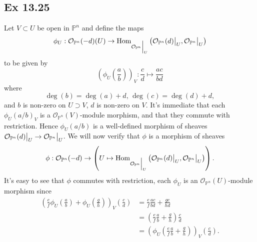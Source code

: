 \documentclass{article}
\newcommand\restr[2]{{%
  \left.\kern-\nulldelimiterspace %
  #1 %
  \vphantom{\big|} %
  \right|_{#2} %
  }}
\theoremstyle{definition}
\renewcommand{\P}{\mathbb{P}}
\newcommand{\Pn}{\P^n}
\newcommand{\Hom}{\text{Hom}}
\newcommand{\oo}{\mathcal{O}}
\begin{document}
\subsection*{Ex 13.25}

Let $V \subset U$ be open in $\Pn$ and define the maps
\[
	\phi_U 
	: 
	\oo_{\Pn}(-d)(U) 
	\to
	\Hom_{\restr{\oo_{\Pn}}{U}}\left(\restr{\oo_{\Pn}(d)}{U}, \restr{\oo_{\Pn}}{U}\right)
\]
to be
given by 
\[
	\left(\phi_U\left(\frac{a}{b}\right)\right)_V : 
	\frac{c}{d}
	\mapsto
	\frac{ac}{bd}
\] 
where
\[
	\deg(b) = \deg(a) + d,\,
	\deg(c) = \deg(d) + d,
\]
and $b$ is non-zero on $U \supset V$, $d$ is non-zero on $V$. It's immediate
that each $\phi_U(a/b)_V$ is a $\oo_{\Pn}(V)$-module morphism, and that they
commute with restriction. Hence $\phi_U(a/b)$ is a well-defined morphism of
sheaves $\restr{\oo_{\Pn}(d)}{U} \to \restr{\oo_{\Pn}}{U}$. We will now verify
that $\phi$ is a morphism of sheaves
\[
	\phi 
	: 
	\oo_{\Pn}(-d)
	\to
	\left(U \mapsto \Hom_{\restr{\oo_{\Pn}}{U}}\left(\restr{\oo_{\Pn}(d)}{U}, \restr{\oo_{\Pn}}{U}\right)\right).
\]
It's easy to see that $\phi$ commutes with restriction, each $\phi_U$
is an $\oo_{\Pn}(U)$-module morphism since 
\begin{align*}
	\left(\frac{e}{f}\phi_U\left(\frac{a}{b}\right) + \phi_U\left(\frac{g}{h}\right)\right)_V
	\left(\frac{c}{d}\right)
	&=
	\frac{e}{f}
	\frac{ac}{bd}
	+
	\frac{gc}{hd} \\
	&=
	\left(\frac{e}{f}
	\frac{a}{b}
	+
	\frac{g}{h}\right)
	\frac{c}{d} \\
	&=
	\left(\phi_U\left(\frac{e}{f}\frac{a}{b} + \frac{g}{h}\right)\right)_V\left(\frac{c}{d}\right).
\end{align*} 
\end{document}
